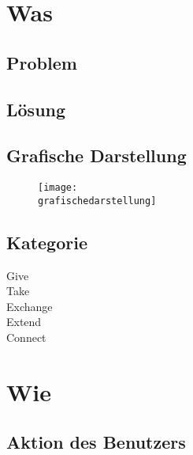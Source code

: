 

\maketitle

\section*{Was}

\subsection*{Problem}
\desc

\subsection*{Lösung}
\solution

\subsection*{Grafische Darstellung}
\begin{figure}[H]
\texttt{[image: \\grafischedarstellung]}
\end{figure}

\subsection*{Kategorie}
 Give \\
 Take \\
 Exchange \\
 Extend \\
 Connect



\section*{Wie}

\subsection*{Aktion des Benutzers}
\useraction


